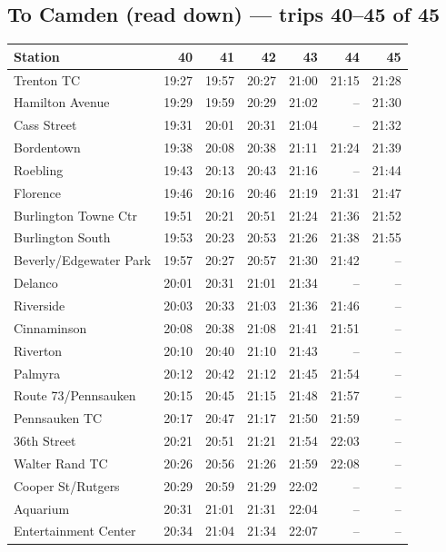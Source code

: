 \subsection*{To Camden (read down) --- trips 40--45 of 45}
\begin{center}\footnotesize\setlength{\tabcolsep}{3pt}\begin{tabular}{@{}lrrrrrr@{}}\toprule
Station & 40 & 41 & 42 & 43 & 44 & 45 \\\midrule
Trenton TC & 19:27 & 19:57 & 20:27 & 21:00 & 21:15 & 21:28 \\
Hamilton Avenue & 19:29 & 19:59 & 20:29 & 21:02 & -- & 21:30 \\
Cass Street & 19:31 & 20:01 & 20:31 & 21:04 & -- & 21:32 \\
Bordentown & 19:38 & 20:08 & 20:38 & 21:11 & 21:24 & 21:39 \\
Roebling & 19:43 & 20:13 & 20:43 & 21:16 & -- & 21:44 \\
Florence & 19:46 & 20:16 & 20:46 & 21:19 & 21:31 & 21:47 \\
Burlington Towne Ctr & 19:51 & 20:21 & 20:51 & 21:24 & 21:36 & 21:52 \\
Burlington South & 19:53 & 20:23 & 20:53 & 21:26 & 21:38 & 21:55 \\
Beverly/Edgewater Park & 19:57 & 20:27 & 20:57 & 21:30 & 21:42 & -- \\
Delanco & 20:01 & 20:31 & 21:01 & 21:34 & -- & -- \\
Riverside & 20:03 & 20:33 & 21:03 & 21:36 & 21:46 & -- \\
Cinnaminson & 20:08 & 20:38 & 21:08 & 21:41 & 21:51 & -- \\
Riverton & 20:10 & 20:40 & 21:10 & 21:43 & -- & -- \\
Palmyra & 20:12 & 20:42 & 21:12 & 21:45 & 21:54 & -- \\
Route 73/Pennsauken & 20:15 & 20:45 & 21:15 & 21:48 & 21:57 & -- \\
Pennsauken TC & 20:17 & 20:47 & 21:17 & 21:50 & 21:59 & -- \\
36th Street & 20:21 & 20:51 & 21:21 & 21:54 & 22:03 & -- \\
Walter Rand TC & 20:26 & 20:56 & 21:26 & 21:59 & 22:08 & -- \\
Cooper St/Rutgers & 20:29 & 20:59 & 21:29 & 22:02 & -- & -- \\
Aquarium & 20:31 & 21:01 & 21:31 & 22:04 & -- & -- \\
Entertainment Center & 20:34 & 21:04 & 21:34 & 22:07 & -- & -- \\
\bottomrule\end{tabular}\end{center}
\clearpage
